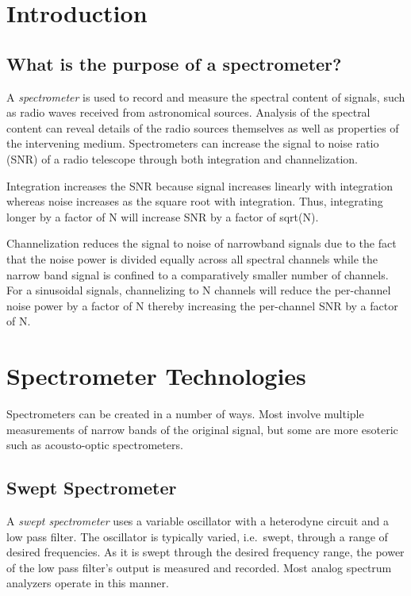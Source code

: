 \documentclass{article}
\begin{document}
\section{Introduction}\label{introduction}

\subsection{What is the purpose of a
spectrometer?}\label{what-is-the-purpose-of-a-spectrometer}

A \emph{spectrometer} is used to record and measure the spectral content
of signals, such as radio waves received from astronomical sources.
Analysis of the spectral content can reveal details of the radio sources
themselves as well as properties of the intervening medium.
Spectrometers can increase the signal to noise ratio (SNR) of a radio
telescope through both integration and channelization.

Integration increases the SNR because signal increases linearly with
integration whereas noise increases as the square root with integration.
Thus, integrating longer by a factor of N will increase SNR by a factor
of sqrt(N).

Channelization reduces the signal to noise of narrowband signals due to
the fact that the noise power is divided equally across all spectral
channels while the narrow band signal is confined to a comparatively
smaller number of channels. For a sinusoidal signals, channelizing to N
channels will reduce the per-channel noise power by a factor of N
thereby increasing the per-channel SNR by a factor of N.

\section{Spectrometer Technologies}\label{spectrometer-technologies}

Spectrometers can be created in a number of ways. Most involve multiple
measurements of narrow bands of the original signal, but some are more
esoteric such as acousto-optic spectrometers.

\subsection{Swept Spectrometer}\label{swept-spectrometer}

A \emph{swept spectrometer} uses a variable oscillator with a heterodyne
circuit and a low pass filter. The oscillator is typically varied,
i.e.~swept, through a range of desired frequencies. As it is swept
through the desired frequency range, the power of the low pass filter's
output is measured and recorded. Most analog spectrum analyzers operate
in this manner.
\end{document}
